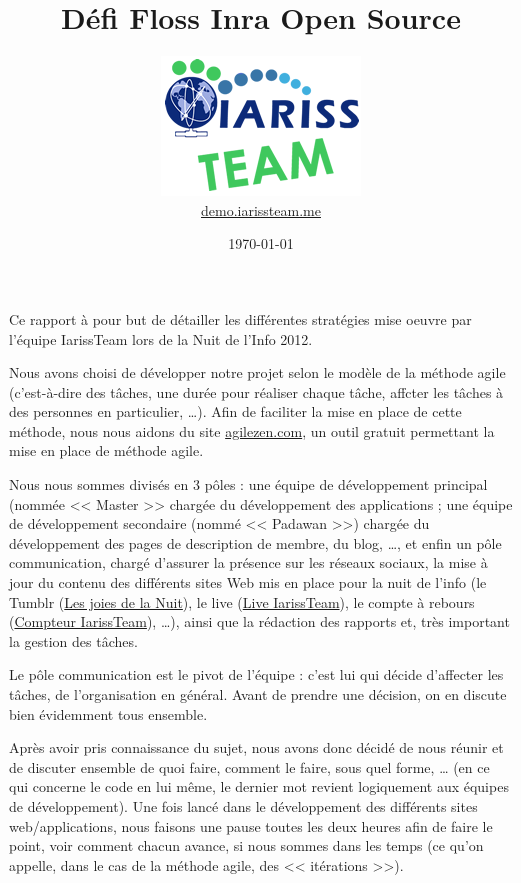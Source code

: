\documentclass[12pt, a4paper]{article}
\title{Défi Floss Inra Open Source}
\newcommand{\espace}{\vspace{.8cm}}
\begin{document}
\author{\includegraphics{../_img/iariss_team.png} \\ {\sffamily \href{http://demo.iarissteam.me}{demo.iarissteam.me}}}
\date{\today}

\maketitle{}

{\sffamily Ce rapport à pour but de détailler les différentes stratégies mise oeuvre par l'équipe IarissTeam lors de la Nuit de l'Info 2012.} 

\espace{}
Nous avons choisi de développer notre projet selon le modèle de la méthode agile (c'est-à-dire des tâches, une durée pour réaliser chaque tâche, affcter les tâches à des personnes en particulier, \ldots{}). Afin de faciliter la mise en place de cette méthode, nous nous aidons du site \href{http://www.agilezen.com/}{agilezen.com}, un outil gratuit permettant la mise en place de méthode agile.

Nous nous sommes divisés en 3 pôles : une équipe de développement principal (nommée << Master >> chargée du développement des applications ; une équipe de développement secondaire (nommé << Padawan >>) chargée du développement des pages de description de membre, du blog, \ldots{},  et enfin un pôle communication, chargé d'assurer la présence sur les réseaux sociaux, la mise à jour du contenu des différents sites Web mis en place pour la nuit de l'info (le Tumblr (\href{http://lesjoiesdelanuit.tumblr.com/}{Les joies de la Nuit}), le live (\href{http://live.iarissteam.me/}{Live IarissTeam}), le compte à rebours (\href{http://iarissteam.me/}{Compteur IarissTeam}), \ldots{}), ainsi que la rédaction des rapports et, très important la gestion des tâches.

\espace{}
Le pôle communication est le pivot de l'équipe : c'est lui qui décide d'affecter les tâches, de l'organisation en général. Avant de prendre une décision, on en discute bien évidemment tous ensemble.

Après avoir pris connaissance du sujet, nous avons donc décidé de nous réunir et de discuter ensemble de quoi faire, comment le faire, sous quel forme, \ldots{} (en ce qui concerne le code en lui même, le dernier mot revient logiquement aux équipes de développement). Une fois lancé dans le développement des différents sites web/applications, nous faisons une pause toutes les deux heures afin de faire le point, voir comment chacun avance, si nous sommes dans les temps (ce qu'on appelle, dans le cas de la méthode agile, des << itérations >>).
\end{document}
